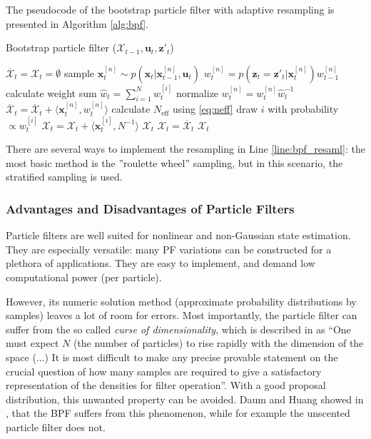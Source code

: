 The pseudocode of the bootstrap particle filter with adaptive resampling is presented in Algorithm \ref{alg:bpf}.
\begin{algorithm}[b!]
    \caption{Bootstrap particle filter ($\mathcal{X}_{t-1}, \mathbf{u}_t, \mathbf{z}'_t$)}\label{alg:bpf}
    \begin{algorithmic}[1]
        \State $\overline{\mathcal{X}}_t = \mathcal{X}_t = \emptyset$
        \State sample $\mathbf{x}_t^{[n]} \sim p(\mathbf{x}_t|\mathbf{x}_{t-1}^{[n]},\mathbf{u}_t)$
        \State$w_t^{[n]} = p(\mathbf{z}_t = \mathbf{z}'_t|\mathbf{x}_{t}^{[n]})w_{t-1}^{[n]}$
        \EndFor
        \State calculate weight sum $\hat{w}_{t} = \sum_{i = 1}^{N}w_t^{[i]}$
        \State normalize $w_t^{[n]} = w_t^{[n]}\hat{w}_t^{-1}$
        \State$\overline{\mathcal{X}}_t = \overline{\mathcal{X}}_t + \langle \mathbf{x}_t^{[n]},w_t^{[n]}\rangle$
        \EndFor
        \State calculate $N_{\mathrm{eff}}$ using \eqref{eq:neff}
        \State draw $i$ with probability $\propto w_t^{[i]}$ \label{line:bpf_resaml}
        \State${\mathcal{X}}_t ={\mathcal{X}}_t + \langle \mathbf{x}_t^{[i]},N^{-1}\rangle$
        \EndFor
        \State\Return $\mathcal{X}_t$
        \Else
        \State$\mathcal{X}_t = \overline{\mathcal{X}}_t$
        \State\Return $\mathcal{X}_t$
        \EndIf
    \end{algorithmic}
\end{algorithm}
There are several ways to implement the resampling in Line \ref{line:bpf_resaml}: the most basic method is the ''roulette wheel'' sampling, but in this scenario, the stratified sampling \cite{Li2015} is used.
\subsubsection{Advantages and Disadvantages of Particle Filters}\label{sec:pf_adv_disadv}
Particle filters are well suited for nonlinear and non-Gaussian state estimation. They are especially versatile: many PF variations can be constructed for a plethora of applications. They are easy to implement, and demand low computational power (per particle).

However, its numeric solution method (approximate probability distributions by samples) leaves a lot of room for errors. Most importantly, the particle filter can suffer from the so called \emph{curse of dimensionality}, which is described in \cite{Gordon1993} as ``One must expect $N$ (the number of particles) to rise rapidly with the dimension of the space (...) It is most difficult to make any precise provable statement on the crucial question of how many samples are required to give a satisfactory representation of the densities for filter operation''. With a good proposal distribution, this unwanted property can be avoided. Daum and Huang showed in \cite{Daum2003}, that the BPF suffers from this phenomenon, while for example the unscented particle filter does not.

